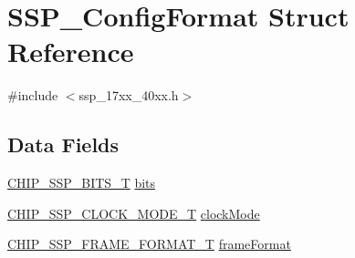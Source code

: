 \hypertarget{structSSP__ConfigFormat}{\section{S\-S\-P\-\_\-\-Config\-Format Struct Reference}
\label{structSSP__ConfigFormat}
}


{\ttfamily \#include $<$ssp\-\_\-17xx\-\_\-40xx.\-h$>$}

\subsection*{Data Fields}
\begin{DoxyCompactItemize}
\item 
\hyperlink{group__SSP__17XX__40XX_ga4e348748c4fb42ef94c2cbd968a43648}{C\-H\-I\-P\-\_\-\-S\-S\-P\-\_\-\-B\-I\-T\-S\-\_\-\-T} \hyperlink{structSSP__ConfigFormat_afaeb54b5e0525adda38644d3ef84dca1}{bits}
\item 
\hyperlink{group__SSP__17XX__40XX_ga12dec81e345a9ffbefd6a1fae5759e09}{C\-H\-I\-P\-\_\-\-S\-S\-P\-\_\-\-C\-L\-O\-C\-K\-\_\-\-M\-O\-D\-E\-\_\-\-T} \hyperlink{structSSP__ConfigFormat_a910e709c7d9e6e367a26028a939b69cf}{clock\-Mode}
\item 
\hyperlink{group__SSP__17XX__40XX_ga207687847d9ab8385057ddeca53c2942}{C\-H\-I\-P\-\_\-\-S\-S\-P\-\_\-\-F\-R\-A\-M\-E\-\_\-\-F\-O\-R\-M\-A\-T\-\_\-\-T} \hyperlink{structSSP__ConfigFormat_ae702ac713d3aa81bffdf140ad8942ec7}{frame\-Format}
\end{DoxyCompactItemize}



